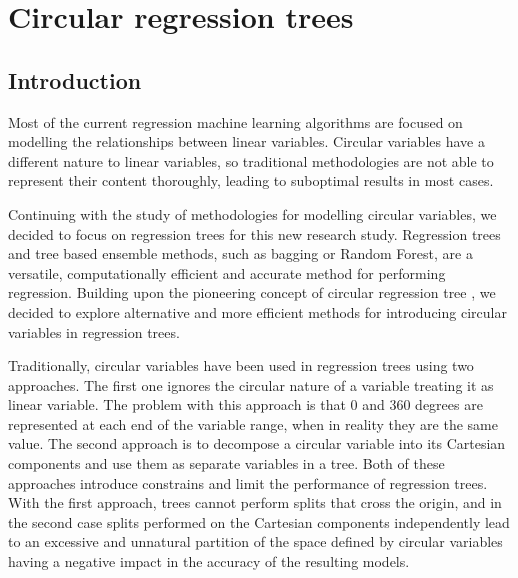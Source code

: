 

\section{Circular regression trees}

\subsection{Introduction}

Most of the current regression machine learning algorithms are focused on modelling the relationships between linear variables. Circular variables have a different nature to linear variables, so traditional methodologies are not able to represent their content thoroughly, leading to suboptimal results in most cases.

\medskip

Continuing with the study of methodologies for modelling circular variables, we decided to focus on regression trees for this new research study. Regression trees and tree based ensemble methods, such as bagging or Random Forest, are a versatile, computationally efficient and accurate method for performing regression. Building upon the pioneering concept of circular regression tree \citep{lund2002tree}, we decided to explore alternative and more efficient methods for introducing circular variables in regression trees.

\medskip

Traditionally, circular variables have been used in regression trees using two approaches. The first one ignores the circular nature of a variable treating it as linear variable. The problem with this approach is that 0 and 360 degrees are represented at each end of the variable range, when in reality they are the same value. The second approach is to decompose a circular variable into its Cartesian components and use them as separate variables in a tree. Both of these approaches introduce constrains and limit the performance of regression trees. With the first approach, trees cannot perform splits that cross the origin, and in the second case splits performed on the Cartesian components independently lead to an excessive and unnatural partition of the space defined by circular variables having a negative impact in the accuracy of the resulting models. 

\medskip


